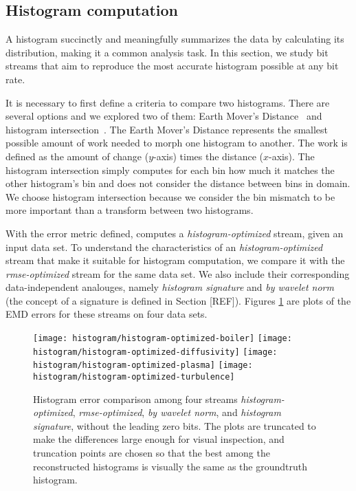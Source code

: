 \subsection{Histogram computation}
\label{sec:histogram}

A histogram succinctly and meaningfully summarizes the data by calculating its distribution, making it a
common analysis task. In this section, we study bit streams that aim to reproduce the most accurate
histogram possible at any bit rate.

It is necessary to first define a criteria to compare two
histograms. There are several options and we explored two of them: Earth Mover's Distance~\cite{emd1998} and
histogram intersection~\cite{histogram_intersection1991}. The Earth Mover's Distance represents
the smallest possible amount of work needed to morph one histogram to another. The work is defined as the
amount of change ($y$-axis) times the distance ($x$-axis). The histogram intersection simply computes for each
bin how much it matches the other histogram's bin and does not consider the distance between bins in domain.
We choose histogram intersection because we consider the bin mismatch to be more important than a transform between two histograms.

With the error metric defined,  computes a
\emph{histogram-optimized} stream, given an input data set. To understand the characteristics of an
\emph{histogram-optimized} stream that make it suitable for histogram computation, we compare it
with the \emph{rmse-optimized} stream for the same data set. We also include their corresponding
data-independent analouges, namely \emph{histogram signature} and \emph{by wavelet norm} (the
concept of a signature is defined in Section [REF]). Figures \ref{fig:histogram-stream-comparison}
are plots of the EMD errors for these streams on four data sets.



\begin{figure}[h]
	\centering
	{\texttt{[image: histogram/histogram-optimized-boiler]}}
	{\texttt{[image: histogram/histogram-optimized-diffusivity]}}
	{\texttt{[image: histogram/histogram-optimized-plasma]}}
	{\texttt{[image: histogram/histogram-optimized-turbulence]}}
	\caption{Histogram error comparison among four streams \emph{histogram-optimized},
	\emph{rmse-optimized}, \emph{by wavelet norm}, and \emph{histogram signature}, without the leading
	zero bits. The plots are truncated to make the differences large enough for visual inspection, and
	truncation points are chosen so that the best among the reconstructed histograms is visually the
	same as the groundtruth histogram. }
	\label{fig:histogram-stream-comparison}
\end{figure}

